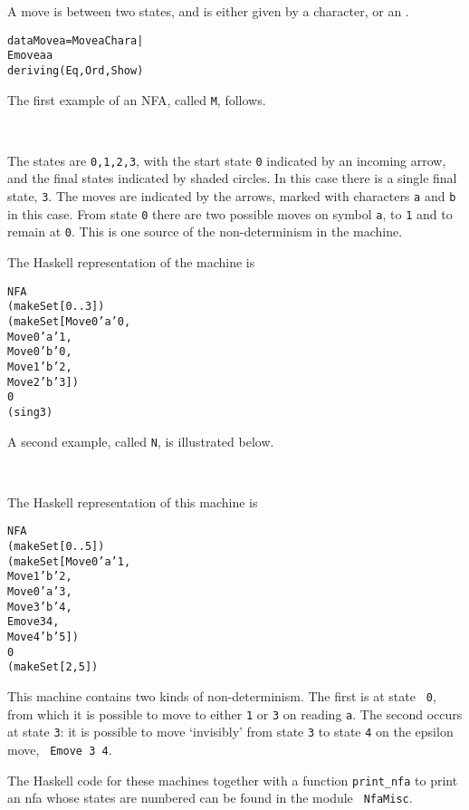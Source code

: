 \documentclass[11pt]{article}
\begin{document}
A move is between two states, and is either given by a character, or an \eps.
\begin{alltt}
data Move a = Move a Char a | 
              Emove a a
              deriving (Eq,Ord,Show)
\end{alltt}
The first example of an NFA, called {\tt M}, follows.

\noindent
\begin{center}\  \end{center}
The states are {\tt 0,1,2,3}, with the start state {\tt 0} indicated by an
incoming arrow, and the final states indicated by shaded circles. In
this case there is a single final state, {\tt 3}. The moves are indicated by
the arrows, marked with characters {\tt a} and {\tt b} in this case. From
state {\tt 0} there are two possible moves on symbol {\tt a}, to {\tt 1} and
to remain at {\tt 0}. This is one source of the non-determinism in the
machine.

The Haskell representation of the machine is 
\begin{alltt}
NFA
(makeSet [0 .. 3])
(makeSet [ Move 0 'a' 0 ,
           Move 0 'a' 1 ,
           Move 0 'b' 0 ,
           Move 1 'b' 2 ,
           Move 2 'b' 3 ])
0
(sing 3)
\end{alltt}
\noindent
A second example, called {\tt N}, is illustrated below.

\noindent
\begin{center}\  \end{center}
The Haskell representation of this machine is

\begin{alltt}
NFA
(makeSet [0 .. 5])
(makeSet [ Move 0 'a' 1,
           Move 1 'b' 2,
           Move 0 'a' 3,
           Move 3 'b' 4,
           Emove 3 4,
           Move 4 'b' 5 ])
0
(makeSet [2,5])
\end{alltt}
This machine contains two kinds of non-determinism. The first is at state {\tt
0}, from which it is possible to move to either {\tt 1} or {\tt 3} on reading
{\tt a}. The second occurs at state {\tt 3}: it is possible to move
`invisibly' from state {\tt 3} to state {\tt 4} on the epsilon move, {\tt
Emove 3 4}.

The Haskell code for these machines together with a function {\tt print\_nfa}
to print an nfa whose states are numbered can be found in the module {\tt
NfaMisc}.
\end{document}

